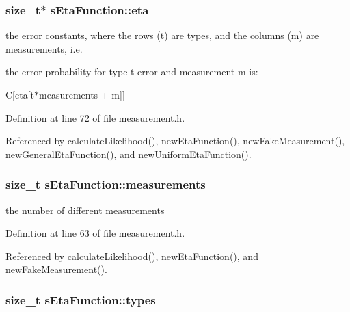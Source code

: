 \hypertarget{structsEtaFunction_a7585a59b1861523157055f8c8b0263e3}{
\subsubsection[{eta}]{\setlength{\rightskip}{0pt plus 5cm}size\-\_\-t$\ast$ {\bf s\-Eta\-Function\-::eta}}}\label{structsEtaFunction_a7585a59b1861523157055f8c8b0263e3}


the error constants, where the rows (t) are types, and the columns (m) are measurements, i.\-e. 

the error probability for type t error and measurement m is\-:

\-C\mbox{[}eta\mbox{[}t$\ast$measurements + m\mbox{]}\mbox{]} 

\-Definition at line 72 of file measurement.\-h.



\-Referenced by calculate\-Likelihood(), new\-Eta\-Function(), new\-Fake\-Measurement(), new\-General\-Eta\-Function(), and new\-Uniform\-Eta\-Function().

\hypertarget{structsEtaFunction_aa323ef11935cd1e8d6ef56405ab96cf8}{
\subsubsection[{measurements}]{\setlength{\rightskip}{0pt plus 5cm}size\-\_\-t {\bf s\-Eta\-Function\-::measurements}}}\label{structsEtaFunction_aa323ef11935cd1e8d6ef56405ab96cf8}


the number of different measurements 



\-Definition at line 63 of file measurement.\-h.



\-Referenced by calculate\-Likelihood(), new\-Eta\-Function(), and new\-Fake\-Measurement().

\hypertarget{structsEtaFunction_afd94a9856047e0987c5e8667a4838b71}{
\subsubsection[{types}]{\setlength{\rightskip}{0pt plus 5cm}size\-\_\-t {\bf s\-Eta\-Function\-::types}}}\label{structsEtaFunction_afd94a9856047e0987c5e8667a4838b71}


